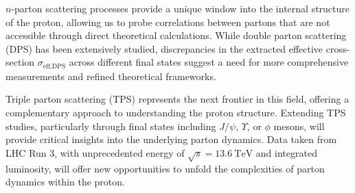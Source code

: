 \documentclass[10pt,twocolumn]{article}
\newcommand*{\effXsecDPS}{\sigma_{\text{eff,DPS}}}
\newcommand*{\TeV}{~\text{TeV}}
\begin{document}
$n$-parton scattering processes provide a unique window into the internal structure of the proton, allowing us to probe correlations between partons that are not accessible through direct theoretical calculations. While double parton scattering (DPS) has been extensively studied, discrepancies in the extracted effective cross-section $\effXsecDPS$ across different final states suggest a need for more comprehensive measurements and refined theoretical frameworks.

Triple parton scattering (TPS) represents the next frontier in this field, offering a complementary approach to understanding the proton structure. Extending TPS studies, particularly through final states including $J/\psi$, $\Upsilon$, or $\phi$ mesons, will provide critical insights into the underlying parton dynamics. Data taken from LHC Run 3, with unprecedented energy of $\sqrt{s} = 13.6\TeV$ and integrated luminosity, will offer new opportunities to unfold the complexities of parton dynamics within the proton.



\end{document}
